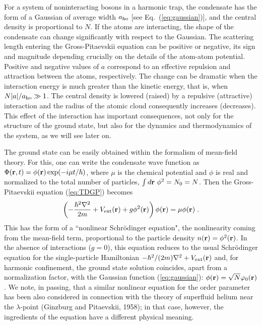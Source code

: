 For a system of noninteracting bosons in a harmonic trap, the condensate 
has the form of a Gaussian of average width $a_{\rm ho}$ [see 
Eq.~(\ref{eq:gaussian})], and the central density is proportional to $N$.
If the atoms are interacting, the shape of the condensate can change
significantly with respect to the Gaussian.  The scattering length
entering the Gross-Pitaevskii equation can be positive or negative, its
sign and magnitude depending crucially on the details of the  atom-atom
potential. Positive and negative values of $a$ correspond to
an effective repulsion and attraction between the atoms, respectively.
The change can be dramatic when the interaction energy is much
greater than the kinetic energy, that is, when  $N |a| /a_{\rm ho} \gg 1$.
The central density is  lowered  (raised)  by a repulsive (attractive)
interaction and the radius of the atomic cloud consequently increases
(decreases). This effect of the interaction has important
consequences, not only for the structure of the ground state,
but also for the dynamics and thermodynamics of the system, as
we will see later on. 

The ground state can be easily obtained within
the formalism of mean-field theory. For this, one can write the
condensate wave function as $\Phi({\bf r},t)=\phi({\bf r})
\exp(-i \mu t/ \hbar)$,  where $\mu$ is the chemical potential
and $\phi$ is real and normalized to the  total number of particles,
$\int d{\bf r} \ \phi^2 = N_0 = N$.  Then the Gross-Pitaevskii
equation (\ref{eq:TDGP}) becomes
\begin{equation}
\left( - { \hbar^2\nabla^2 \over 2m } + V_{\rm ext}({\bf r})  +
g \phi^2 ({\bf r}) \right) \phi({\bf r}) = \mu  \phi({\bf r}) \; .
\label{eq:GP}
\end{equation}
This has  the form of a ``nonlinear Schr\"odinger equation", the
nonlinearity coming from the mean-field term, proportional to the
particle density $n({\bf r})=\phi^2({\bf r})$. In the absence of 
interactions ($g=0$), this equation reduces to the usual 
Schr\"odinger equation for the single-particle Hamiltonian 
$-\hbar^2/(2m)\nabla^2+V_{\rm ext}({\bf r})$ and, for harmonic 
confinement, the ground state solution coincides, apart from a 
normalization factor, with the Gaussian function (\ref{eq:gaussian}):
$\phi({\bf r})=\sqrt{N}\varphi_0({\bf r})$. We note, in passing, 
that a similar nonlinear equation for the order parameter has been 
also considered in connection with the theory of superfluid helium 
near the $\lambda$-point (Ginzburg and Pitaevskii, 1958); in that
case, however, the ingredients of the equation have a different 
physical meaning. 

